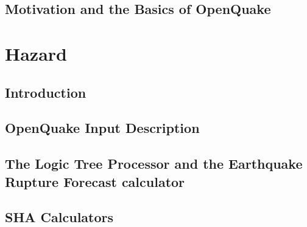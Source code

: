 \documentclass[11pt,a4paper,headings=small,dvips]{scrbook}
\begin{document}
\chapter{Motivation and the Basics of OpenQuake}
	
\part{Hazard}
\chapter{Introduction}
	\label{chap:inthaz}
	
\chapter{OpenQuake Input Description}
	\label{chap:hazinp}
	
\chapter{The Logic Tree Processor and the Earthquake Rupture Forecast 
	calculator}
	\label{chap:erf}
	
	
\chapter{SHA Calculators}
	\label{chap:hazcalc}
	
	
	
	
%	
\end{document}
